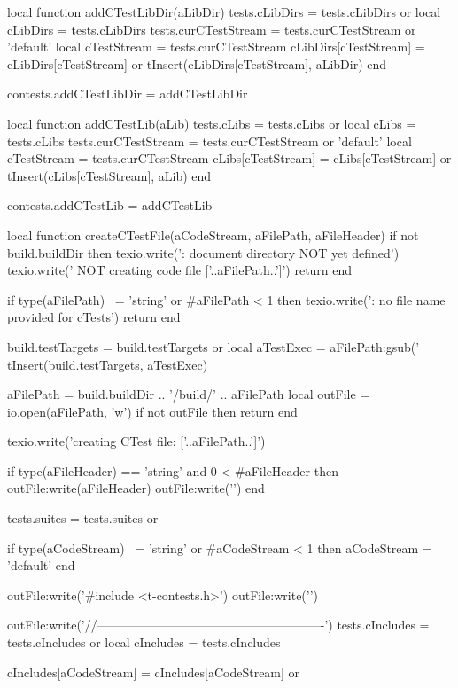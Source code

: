 local function addCTestLibDir(aLibDir)
  tests.cLibDirs        = tests.cLibDirs or { }
  local cLibDirs        = tests.cLibDirs
  tests.curCTestStream  = tests.curCTestStream or 'default'
  local cTestStream     = tests.curCTestStream
  cLibDirs[cTestStream] = cLibDirs[cTestStream] or { }
  tInsert(cLibDirs[cTestStream], aLibDir)
end

contests.addCTestLibDir = addCTestLibDir

local function addCTestLib(aLib)
  tests.cLibs          = tests.cLibs or { }
  local cLibs          = tests.cLibs
  tests.curCTestStream = tests.curCTestStream or 'default'
  local cTestStream    = tests.curCTestStream
  cLibs[cTestStream]   = cLibs[cTestStream] or { }
  tInsert(cLibs[cTestStream], aLib)
end

contests.addCTestLib = addCTestLib

local function createCTestFile(aCodeStream, aFilePath, aFileHeader)
  if not build.buildDir then
    texio.write('\nERROR: document directory NOT yet defined\n')
    texio.write('       NOT creating code file ['..aFilePath..']\n\n')
    return
  end

  if type(aFilePath) ~= 'string'
    or #aFilePath < 1 then
    texio.write('\nERROR: no file name provided for cTests\n\n')
    return
  end

  build.testTargets = build.testTargets or { }
  local aTestExec = aFilePath:gsub('%
  tInsert(build.testTargets, aTestExec)

  aFilePath = build.buildDir .. '/build/' .. aFilePath
  local outFile = io.open(aFilePath, 'w')
  if not outFile then
    return
  end

  texio.write('creating CTest file: ['..aFilePath..']\n')

  if type(aFileHeader) == 'string'
    and 0 < #aFileHeader then
    outFile:write(aFileHeader)
    outFile:write('\n\n')
  end

  tests.suites = tests.suites or { }

  if type(aCodeStream) ~= 'string'
    or #aCodeStream < 1 then
    aCodeStream = 'default'
  end

  outFile:write('#include <t-contests.h>\n')
  outFile:write('\n\n')

  outFile:write('//-------------------------------------------------------\n')
  tests.cIncludes = tests.cIncludes or { }
  local cIncludes = tests.cIncludes

  cIncludes[aCodeStream] = cIncludes[aCodeStream] or { }

